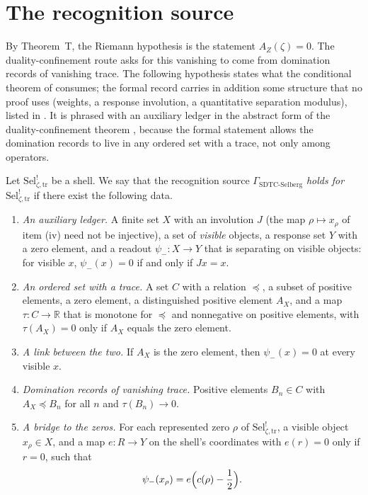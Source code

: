 \documentclass[11pt]{article}
\newcommand{\AZ}{A_{Z}(\zeta)}
\newcommand{\Sel}{\mathrm{Sel}^{!}_{\zeta,\mathrm{tr}}}
\newcommand{\GamSDTCSelberg}{\Gamma_{\mathrm{SDTC\text{-}Selberg}}}
\newcommand{\psim}{\psi_{-}}
\newcommand{\AX}{A_{X}}
\theoremstyle{definition}
\begin{document}
 \section{The recognition source}
\label{sec:recognition_source}

By Theorem~T, the Riemann hypothesis is the statement \(\AZ=0\).  The
duality-confinement route asks for this vanishing to come from
domination records of vanishing trace.  The following hypothesis
states what the conditional theorem of 
consumes; the formal record carries in addition some structure that no
proof uses (weights, a response involution, a quantitative separation
modulus), listed in .  It is phrased with an auxiliary
ledger in the abstract form of the duality-confinement theorem
\citep[Remark~7.2]{TsiokosSDTC2026}, because the formal statement
allows the domination records to live in any ordered set with a trace,
not only among operators.

\begin{obligation}[The recognition source \(\GamSDTCSelberg\)]
\label{obl:rh:gamma-sdtc-selberg}
Let \(\Sel\) be a shell.  We say that the recognition source
\(\GamSDTCSelberg\) \emph{holds for} \(\Sel\) if there exist the
following data.
\begin{enumerate}[label=\textup{(\roman*)}]
  \item \emph{An auxiliary ledger.}  A finite set \(X\) with an involution \(J\) (the map
    \(\rho\mapsto x_\rho\) of item (iv) need not be injective), a set of \emph{visible} objects, a response set
    \(Y\) with a zero element, and a readout
    \(\psim:X\to Y\) that is separating on visible objects:
    for visible \(x\), \(\psim(x)=0\) if and only if \(Jx=x\).
  \item \emph{An ordered set with a trace.}  A set \(C\) with a
    relation \(\preceq\), a subset of positive elements, a zero element,
    a distinguished positive element \(\AX\), and a map
    \(\tau:C\to\mathbb R\) that is monotone for \(\preceq\) and
    nonnegative on positive elements, with \(\tau(\AX)=0\) only if
    \(\AX\) equals the zero element.
  \item[(ii\('\))] \emph{A link between the two.}  If \(\AX\) is the zero
    element, then \(\psim(x)=0\) at every visible \(x\).
  \item \emph{Domination records of vanishing trace.}  Positive
    elements \(B_n\in C\) with \(\AX\preceq B_n\) for all \(n\) and
    \(\tau(B_n)\to0\).
  \item \emph{A bridge to the zeros.}  For each represented zero
    \(\rho\) of \(\Sel\), a visible object \(x_\rho\in X\), and a map
    \(e:R\to Y\) on the shell's coordinates with \(e(r)=0\) only if
    \(r=0\), such that
    \[
      \psim(x_\rho)=e\Bigl(c(\rho)-\frac12\Bigr).
    \]
\end{enumerate}
\end{obligation}
\end{document}
